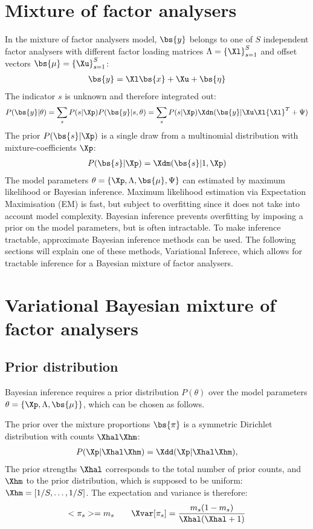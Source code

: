 \documentclass[a4paper]{article}
\begin{document}
\section{Mixture of factor analysers}
In the mixture of factor analysers model, $\bs{y}$ belongs to one of $S$ independent factor analysers with different factor loading matrices $\Lambda=\left\{\Xl\right\}_{s=1}^S$ and offset vectors $\bs{\mu}=\left\{\Xu\right\}_{s=1}^S$:
\begin{align}
  \bs{y}=\Xl\bs{x}+\Xu+\bs{\eta}
\end{align}
The indicator $s$ is unknown and therefore integrated out:
\begin{align}
  P(\bs{y}|\theta)=\sum_s P(s|\Xp)P(\bs{y}|s,\theta)=\sum_s P(s|\Xp)\Xdn(\bs{y}|\Xu\Xl{\Xl}^T+\Psi)
\end{align}
The prior $P(\bs{s}|\Xp)$ is a single draw from a multinomial distribution with mixture-coefficients $\Xp$:
\begin{align}
  P(\bs{s}|\Xp)=\Xdm(\bs{s}|1,\Xp)
\end{align}
The model parameters $\theta=\left\{\Xp,\Lambda,\bs{\mu},\Psi\right\}$ can estimated by maximum likelihood or Bayesian inference. Maximum likelihood estimation via Expectation Maximisation (EM) is fast, but subject to overfitting since it does not take into account model complexity. Bayesian inference prevents overfitting by imposing a prior on the model parameters, but is often intractable. To make inference tractable, approximate Bayesian inference methods can be used. The following sections will explain one of these methods, Variational Inferece, which allows for tractable inference for a Bayesian mixture of factor analysers.

\newpage
\section{Variational Bayesian mixture of factor analysers}
\subsection{Prior distribution}
Bayesian inference requires a prior distribution $P(\theta)$ over the model parameters $\theta=\left\{\Xp,\Lambda,\bs{\mu}\right\}$, which can be chosen as follows.

The prior over the mixture proportions $\bs{\pi}$ is a symmetric Dirichlet distribution with counts $\Xhal\Xhm$:
\begin{align}
  P(\Xp|\Xhal\Xhm)=\Xdd(\Xp|\Xhal\Xhm),
\end{align}
The prior strengths $\Xhal$ corresponds to the total number of prior counts, and $\Xhm$ to the prior distribution, which is supposed to be uniform: $\Xhm=[1/S,\dots,1/S]$.
The expectation and variance is therefore:
\begin{align}
  <\pi_s>=m_s \qquad \Xvar[\pi_s]=\frac{m_s(1-m_s)}{\Xhal(\Xhal+1)}
\end{align}
\end{document}
